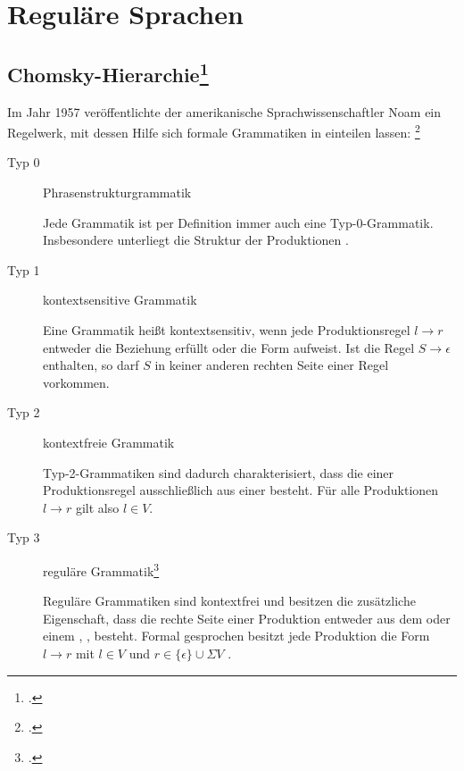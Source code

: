 \documentclass{lehramt-informatik-haupt}
\begin{document}

\chapter{Reguläre Sprachen}

\section{Chomsky-Hierarchie\footcite{wiki:chomsky}}

Im Jahr 1957 veröffentlichte der amerikanische Sprachwissenschaftler
Noam  ein Regelwerk, mit dessen Hilfe sich formale
Grammatiken in  einteilen lassen:
\footcite[Seite 168]{hoffmann}

\begin{description}
\item[Typ 0] Phrasenstrukturgrammatik

Jede Grammatik ist per Definition immer auch eine Typ-0-Grammatik.
Insbesondere unterliegt die Struktur der Produktionen .

\item[Typ 1] kontextsensitive Grammatik

Eine Grammatik heißt kontextsensitiv, wenn jede Produktionsregel $l
\rightarrow r$ entweder die Beziehung  erfüllt
oder die Form  aufweist. Ist die Regel
$S \rightarrow \epsilon$ enthalten, so darf $S$ in keiner anderen
rechten Seite einer Regel vorkommen.

\item[Typ 2] kontextfreie Grammatik

Typ-2-Grammatiken sind dadurch charakterisiert, dass die  einer Produktionsregel ausschließlich aus einer  besteht. Für alle Produktionen $l \rightarrow r$ gilt also $l
\in V$.

\item[Typ 3] reguläre Grammatik\footcite[Seite 14]{theo:fs:1}

Reguläre Grammatiken sind kontextfrei und besitzen die zusätzliche
Eigenschaft, dass die rechte Seite einer Produktion entweder aus dem
 oder einem ,
, besteht. Formal gesprochen
besitzt jede Produktion die Form $l \rightarrow r$ mit $l \in V$ und $r
\in \{ \epsilon \} \cup \Sigma V$ .
\end{description}
\end{document}

